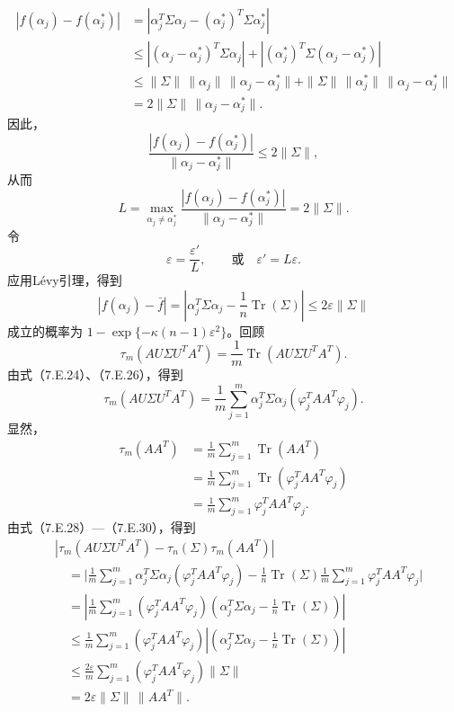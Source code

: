 \[
\begin{aligned}
|f(\alpha_j)-f(\alpha_j^*)|
 &=\left|\alpha_j^T\Sigma\alpha_j-(\alpha_j^*)^T\Sigma\alpha_j^*\right|\\
 &\le\left|(\alpha_j-\alpha_j^*)^T\Sigma\alpha_j\right|
  +\left|(\alpha_j^*)^T\Sigma(\alpha_j-\alpha_j^*)\right|\\
 &\le\|\Sigma\|\,\|\alpha_j\|\,\|\alpha_j-\alpha_j^*\|
   +\|\Sigma\|\,\|\alpha_j^*\|\,\|\alpha_j-\alpha_j^*\|\\
 &=2\|\Sigma\|\,\|\alpha_j-\alpha_j^*\|.
\end{aligned}
\]
因此，
\[
\frac{|f(\alpha_j)-f(\alpha_j^*)|}{\|\alpha_j-\alpha_j^*\|}\le2\|\Sigma\|,
\]
从而
\[
L=\max_{\alpha_j\ne\alpha_j^*}
 \frac{|f(\alpha_j)-f(\alpha_j^*)|}{\|\alpha_j-\alpha_j^*\|}=2\|\Sigma\|.
\]
令
\[
\varepsilon=\frac{\varepsilon'}L,\qquad\text{或}\quad\varepsilon'=L\varepsilon.
\]
应用Lévy引理，得到
\begin{equation}
|f(\alpha_j)-\bar f|
 =\left|\alpha_j^T\Sigma\alpha_j-\frac1n\operatorname{Tr}(\Sigma)\right|
 \le2\varepsilon\|\Sigma\|\tag{7.E.28}
\end{equation}
成立的概率为 $1-\exp\{-\kappa(n-1)\varepsilon^2\}$。回顾
\[
\tau_m(AU\Sigma U^TA^T)=\frac1m\operatorname{Tr}(AU\Sigma U^TA^T).
\]
由式（7.E.24）、（7.E.26），得到
\begin{equation}
\tau_m(AU\Sigma U^TA^T)=\frac1m\sum_{j=1}^m
 \alpha_j^T\Sigma\alpha_j(\varphi_j^TAA^T\varphi_j).\tag{7.E.29}
\end{equation}
显然，
\begin{equation}
\begin{aligned}
\tau_m(AA^T)&=\frac1m\sum_{j=1}^m\operatorname{Tr}(AA^T)\\
 &=\frac1m\sum_{j=1}^m\operatorname{Tr}(\varphi_j^TAA^T\varphi_j)\\
 &=\frac1m\sum_{j=1}^m\varphi_j^TAA^T\varphi_j.
\end{aligned}\tag{7.E.30}
\end{equation}
由式（7.E.28）—（7.E.30），得到
\[
\begin{aligned}
&\left|\tau_m(AU\Sigma U^TA^T)-\tau_n(\Sigma)\tau_m(AA^T)\right|\\
&\quad=\biggl|\frac1m\sum_{j=1}^m\alpha_j^T\Sigma\alpha_j(\varphi_j^TAA^T\varphi_j)
 -\frac1n\operatorname{Tr}(\Sigma)\frac1m\sum_{j=1}^m\varphi_j^TAA^T\varphi_j\biggr|\\
&\quad=\left|\frac1m\sum_{j=1}^m(\varphi_j^TAA^T\varphi_j)
 \left(\alpha_j^T\Sigma\alpha_j-\frac1n\operatorname{Tr}(\Sigma)\right)\right|\\
&\quad\le\frac1m\sum_{j=1}^m(\varphi_j^TAA^T\varphi_j)
 \left|\left(\alpha_j^T\Sigma\alpha_j-\frac1n\operatorname{Tr}(\Sigma)\right)\right|\\
&\quad\le\frac{2\varepsilon}m\sum_{j=1}^m(\varphi_j^TAA^T\varphi_j)\|\Sigma\|\\
&\quad=2\varepsilon\|\Sigma\|\,\|AA^T\|.
\end{aligned}
\]
